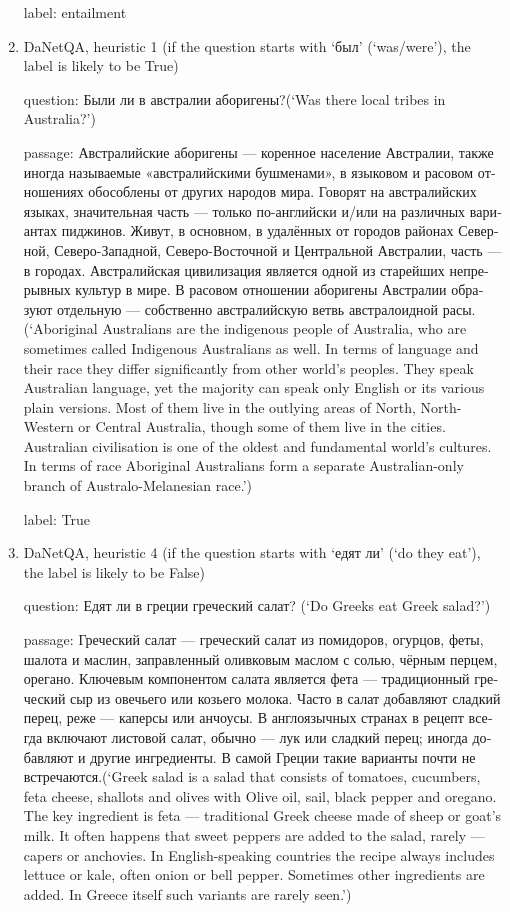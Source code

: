 \documentclass[11pt]{article}
\begin{document}
\begin{enumerate}
label: entailment

    \item DaNetQA, heuristic 1 (if the question starts with \foreignlanguage{russian}{`был'} (`was/were'), the label is likely to be True)

question: \foreignlanguage{russian}{Были ли в австралии аборигены?}(`Was there local tribes in Australia?')

passage: \foreignlanguage{russian}{Австралийские аборигены — коренное население Австралии, также иногда называемые «австралийскими бушменами», в языковом и расовом отношениях обособлены от других народов мира. Говорят на австралийских языках, значительная часть — только по-английски и/или на различных вариантах пиджинов. Живут, в основном, в удалённых от городов районах Северной, Северо-Западной, Северо-Восточной и Центральной Австралии, часть — в городах. Австралийская цивилизация является одной из старейших непрерывных культур в мире. В расовом отношении аборигены Австралии образуют отдельную — собственно австралийскую ветвь австралоидной расы.} (`Aboriginal Australians are the indigenous people of Australia, who are sometimes called Indigenous Australians as well. In terms of language and their race they differ significantly from other world's peoples. They speak Australian language, yet the majority can speak only English or its various plain versions. Most of them live in the outlying areas of North, North-Western or Central Australia, though some of them live in the cities. Australian civilisation is one of the oldest and fundamental world's cultures. In terms of race Aboriginal Australians form a separate Australian-only branch of Australo-Melanesian race.')

label: True

    \item DaNetQA, heuristic 4 (if the question starts with \foreignlanguage{russian}{`едят ли'} (`do they eat'), the label is likely to be False)

question: \foreignlanguage{russian}{Едят ли в греции греческий салат?} (`Do Greeks eat Greek salad?')

passage: \foreignlanguage{russian}{Греческий салат — греческий салат из помидоров, огурцов, феты, шалота и маслин, заправленный оливковым маслом с солью, чёрным перцем, орегано. Ключевым компонентом салата является фета — традиционный греческий сыр из овечьего или козьего молока. Часто в салат добавляют сладкий перец, реже — каперсы или анчоусы. В англоязычных странах в рецепт всегда включают листовой салат, обычно — лук или сладкий перец; иногда добавляют и другие ингредиенты. В самой Греции такие варианты почти не встречаются.}(`Greek salad is a salad that consists of tomatoes, cucumbers, feta cheese, shallots and olives with Olive oil, sail, black pepper and oregano. The key ingredient is feta --- traditional Greek cheese made of sheep or goat’s milk. It often happens that sweet peppers are added to the salad, rarely --- capers or anchovies. In English-speaking countries the recipe always includes lettuce or kale, often onion or bell pepper. Sometimes other ingredients are added. In Greece itself such variants are rarely seen.')


\end{enumerate}
\end{document}
